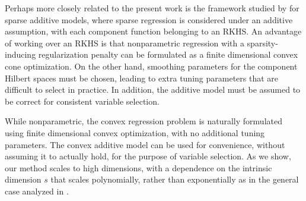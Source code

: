 Perhaps more closely related to the present work is the framework
studied by \cite{Raskutti:12} for sparse additive models, where sparse
regression is considered under an additive assumption, with each
component function belonging to an RKHS.  An advantage of working over
an RKHS is that nonparametric regression with a sparsity-inducing
regularization penalty can be formulated as a finite dimensional
convex cone optimization.  On the other hand, smoothing parameters for
the component Hilbert spaces must be chosen, leading to extra tuning
parameters that are difficult to select in practice.  In addition, the
additive model must be assumed to be correct for consistent variable
selection. 

While nonparametric, the convex regression problem is naturally
formulated using finite dimensional convex optimization, with no
additional tuning parameters.  The convex additive model can be used
for convenience, without assuming it to actually hold, for the purpose
of variable selection.  As we show, our method scales to high
dimensions, with a dependence on the intrinsic dimension $s$ that
scales polynomially, rather than exponentially as in the general case
analyzed in \cite{dalalyan:12}.



%
%
%
%
%
%
%
%


